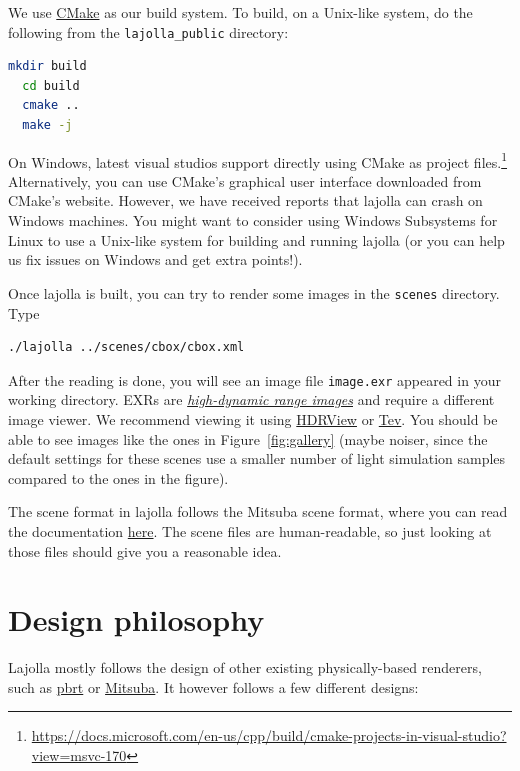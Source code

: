 We use \href{https://cmake.org/}{CMake} as our build system. To build, on a Unix-like system, do the following from the \lstinline{lajolla_public} directory:

\begin{lstlisting}[language=bash]
  mkdir build
  cd build
  cmake ..
  make -j
\end{lstlisting}

On Windows, latest visual studios support directly using CMake as project files.\footnote{\url{https://docs.microsoft.com/en-us/cpp/build/cmake-projects-in-visual-studio?view=msvc-170}} Alternatively, you can use CMake's graphical user interface downloaded from CMake's website. However, we have received reports that lajolla can crash on Windows machines. You might want to consider using Windows Subsystems for Linux to use a Unix-like system for building and running lajolla (or you can help us fix issues on Windows and get extra points!). 

Once lajolla is built, you can try to render some images in the \lstinline{scenes} directory. Type
\begin{lstlisting}[language=bash]
  ./lajolla ../scenes/cbox/cbox.xml
\end{lstlisting}

After the reading is done, you will see an image file \lstinline{image.exr} appeared in your working directory. EXRs are \href{https://en.wikipedia.org/wiki/High_dynamic_range}{\emph{high-dynamic range images}} and require a different image viewer. We recommend viewing it using \href{https://github.com/wkjarosz/hdrview}{HDRView} or \href{https://github.com/Tom94/tev}{Tev}. You should be able to see images like the ones in Figure~\ref{fig:gallery} (maybe noiser, since the default settings for these scenes use a smaller number of light simulation samples compared to the ones in the figure).

The scene format in lajolla follows the Mitsuba scene format, where you can read the documentation \href{https://www.mitsuba-renderer.org/releases/current/documentation.pdf}{here}. The scene files are human-readable, so just looking at those files should give you a reasonable idea.

\section{Design philosophy}

Lajolla mostly follows the design of other existing physically-based renderers, such as \href{https://github.com/mmp/pbrt-v3/}{pbrt} or \href{http://www.mitsuba-renderer.org/}{Mitsuba}. It however follows a few different designs:

